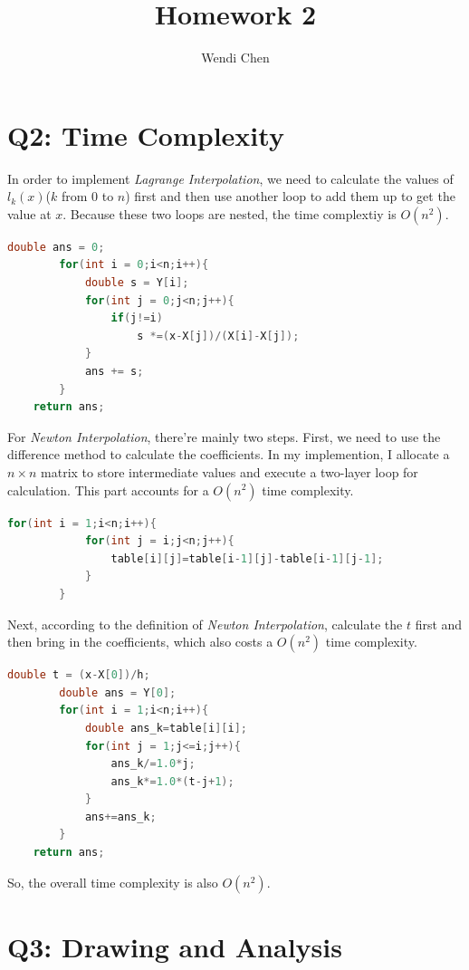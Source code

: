 \documentclass[a4paper]{article}
\title{\textbf{Homework 2}}
\author{Wendi Chen}
\date{}
\begin{document}
\maketitle

\section{Q2: Time Complexity}
In order to implement \emph{Lagrange Interpolation}, we need to calculate the values of $l_{k}(x)$($k$ from $0$ to $n$) first and then use another loop to add them up to get the value at $x$.
Because these two loops are nested, the time complextiy is $O(n^{2})$.
\begin{lstlisting}[language={c++}]
        double ans = 0;
        for(int i = 0;i<n;i++){
            double s = Y[i];
            for(int j = 0;j<n;j++){
                if(j!=i)
                    s *=(x-X[j])/(X[i]-X[j]);
            }
            ans += s;
        }
	return ans;
\end{lstlisting}

For \emph{Newton Interpolation}, there're mainly two steps.
First, we need to use the difference method to calculate the coefficients.
In my implemention, I allocate a $n\times n$ matrix to store intermediate values and execute a two-layer loop for calculation.
This part accounts for a $O(n^{2})$ time complexity.

\begin{lstlisting}[language={c++}]
	for(int i = 1;i<n;i++){
            for(int j = i;j<n;j++){
                table[i][j]=table[i-1][j]-table[i-1][j-1];
            }
        }
\end{lstlisting}

Next, according to the definition of \emph{Newton Interpolation}, calculate the $t$ first and then bring in the coefficients, which also costs a $O(n^{2})$ time complexity. 
\begin{lstlisting}[language={c++}]
	double t = (x-X[0])/h;
        double ans = Y[0];
        for(int i = 1;i<n;i++){
            double ans_k=table[i][i];
            for(int j = 1;j<=i;j++){
                ans_k/=1.0*j;
                ans_k*=1.0*(t-j+1);
            }
            ans+=ans_k;
        }
	return ans;
\end{lstlisting}

So, the overall time complexity is also $O(n^{2})$.

\section{Q3: Drawing and Analysis}
\end{document}
